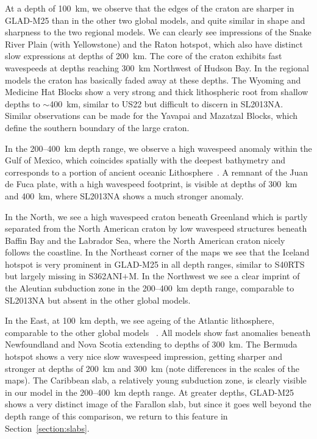 \documentclass[extra,mreferee]{gji}
\begin{document}
At a depth of 100~km, we observe that the edges of the craton are sharper in
GLAD-M25 than in the other two global models,
and quite similar in shape and sharpness to the two regional models.
We can clearly see impressions of the Snake River Plain (with Yellowstone)
and the Raton hotspot, which also have distinct slow expressions at depths of 200~km.
The core of the craton exhibits fast wavespeeds at depths reaching 300~km Northwest of
Hudson Bay.
In the regional models the craton has basically faded away at these depths.
The Wyoming and Medicine Hat Blocks show a very strong and thick lithospheric
root from shallow depths to $\sim$400~km, similar to US22 but
difficult to discern in SL2013NA.
Similar observations can be made for the Yavapai and
Mazatzal Blocks, which define the southern boundary of the large craton.

In the 200--400~km depth range, we observe a high wavespeed
anomaly within the Gulf of Mexico, which coincides spatially with the deepest
bathymetry and corresponds to a portion of ancient oceanic
Lithosphere~\citep{muller2008, schaeffer2014imaging}.
A remnant of the Juan de Fuca plate,
with a high wavespeed footprint, is visible at depths of 300~km and 400~km,
where SL2013NA shows a much stronger anomaly.

In the North, we see a high wavespeed craton beneath Greenland which is partly
separated from the North American craton by low wavespeed structures beneath
Baffin Bay and the Labrador Sea, where the North American craton nicely follows
the coastline.
In the Northeast corner of the maps we see that the Iceland hotspot is very
prominent in GLAD-M25 in all depth ranges, similar to S40RTS but largely missing
in S362ANI$+$M. In the Northwest we see a clear imprint of the Aleutian
subduction zone in the 200--400~km depth range, comparable to SL2013NA but absent
in the other global models.

In the East, at 100~km depth,
we see ageing of the Atlantic lithosphere, comparable to the other global models
~\citep{muller2008, schaeffer2014imaging}.
All models show fast anomalies beneath Newfoundland and Nova Scotia extending to
depths of 300~km. The Bermuda hotspot shows a very nice slow wavespeed impression,
getting sharper and stronger at depths of 200~km and 300~km (note differences in
the scales of the maps).
The Caribbean slab, a relatively young subduction zone, is clearly
visible in our model in the 200--400~km depth range.
At greater depths,
GLAD-M25 shows a very distinct image of the Farallon slab,
but since it goes well beyond the depth range of this comparison,
we return to this feature in Section~\ref{section:slabs}.
\end{document}

